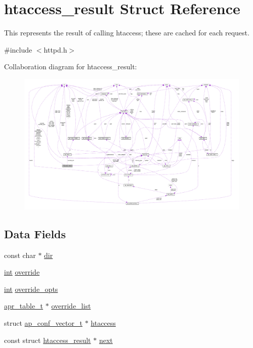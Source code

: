 \hypertarget{structhtaccess__result}{}\section{htaccess\+\_\+result Struct Reference}
\label{structhtaccess__result}


This represents the result of calling htaccess; these are cached for each request.  




{\ttfamily \#include $<$httpd.\+h$>$}



Collaboration diagram for htaccess\+\_\+result\+:
\nopagebreak
\begin{figure}[H]
\begin{center}
\leavevmode
\includegraphics[width=350pt]{structhtaccess__result__coll__graph}
\end{center}
\end{figure}
\subsection*{Data Fields}
\begin{DoxyCompactItemize}
\item 
const char $\ast$ \hyperlink{structhtaccess__result_a44cbad360a6b07466a9bb074a5c31c10}{dir}
\item 
\hyperlink{pcre_8txt_a42dfa4ff673c82d8efe7144098fbc198}{int} \hyperlink{structhtaccess__result_a7e24a89c3770b6c9096ff8b171687aa1}{override}
\item 
\hyperlink{pcre_8txt_a42dfa4ff673c82d8efe7144098fbc198}{int} \hyperlink{structhtaccess__result_adbb318bd9a0fb55ecf52ff32c109acd0}{override\+\_\+opts}
\item 
\hyperlink{structapr__table__t}{apr\+\_\+table\+\_\+t} $\ast$ \hyperlink{structhtaccess__result_a5c8747f6961b50fb842c3a7c8aff0f4a}{override\+\_\+list}
\item 
struct \hyperlink{group__APACHE__CORE__CONFIG_ga614684670dbf748a70ac6bad272da59c}{ap\+\_\+conf\+\_\+vector\+\_\+t} $\ast$ \hyperlink{structhtaccess__result_ac582918fea5f8a8665de0d7677e2e8e5}{htaccess}
\item 
const struct \hyperlink{structhtaccess__result}{htaccess\+\_\+result} $\ast$ \hyperlink{structhtaccess__result_ad7f156c7008865fc065eb6c3c27084f7}{next}
\end{DoxyCompactItemize}



